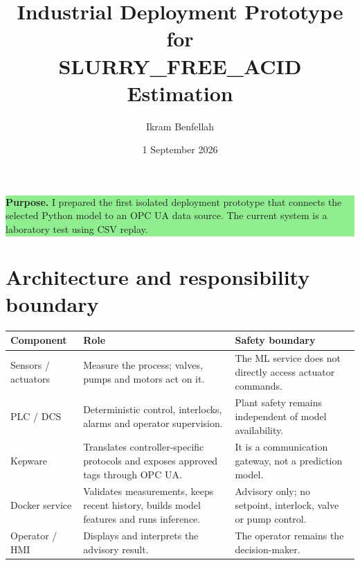 \documentclass[11pt,a4paper]{article}
\title{\textbf{Industrial Deployment Prototype for\\SLURRY\_FREE\_ACID Estimation}}
\author{Ikram Benfellah}
\date{1 September 2026}
\begin{document}
\maketitle

\begin{center}
\colorbox{lightgreen}{\parbox{0.91\textwidth}{
\textbf{Purpose.} I prepared the first isolated deployment prototype that connects the selected Python model to an OPC UA data source. The current system is a laboratory test using CSV replay.
}}
\end{center}

\section{Architecture and responsibility boundary}

\begin{center}
\end{center}

\begin{tabularx}{\textwidth}{@{}L{2.6cm}YY@{}}
\toprule
\textbf{Component} & \textbf{Role} & \textbf{Safety boundary} \\
\midrule
Sensors / actuators & Measure the process; valves, pumps and motors act on it. & The ML service does not directly access actuator commands. \\
PLC / DCS & Deterministic control, interlocks, alarms and operator supervision. & Plant safety remains independent of model availability. \\
Kepware & Translates controller-specific protocols and exposes approved tags through OPC UA. & It is a communication gateway, not a prediction model. \\
Docker service & Validates measurements, keeps recent history, builds model features and runs inference. & Advisory only; no setpoint, interlock, valve or pump control. \\
Operator / HMI & Displays and interprets the advisory result. & The operator remains the decision-maker. \\
\bottomrule
\end{tabularx}
\end{document}
